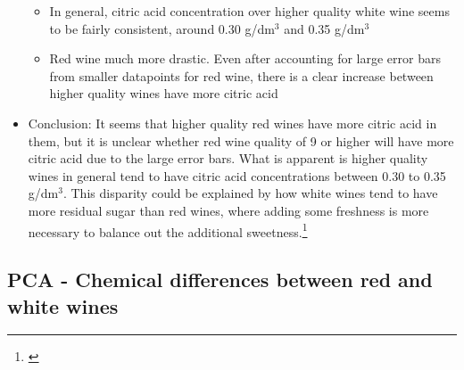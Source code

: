 \documentclass[
]{article}
\providecommand{\tightlist}{%
  \setlength{\itemsep}{0pt}\setlength{\parskip}{0pt}}
\begin{document}
\begin{itemize}
  \begin{itemize}
  \tightlist
  \item
    In general, citric acid concentration over higher quality white wine
    seems to be fairly consistent, around 0.30 g/dm\(^3\) and 0.35
    g/dm\(^3\)
  \item
    Red wine much more drastic. Even after accounting for large error
    bars from smaller datapoints for red wine, there is a clear increase
    between higher quality wines have more citric acid
  \end{itemize}
\item
  Conclusion: It seems that higher quality red wines have more citric
  acid in them, but it is unclear whether red wine quality of 9 or
  higher will have more citric acid due to the large error bars. What is
  apparent is higher quality wines in general tend to have citric acid
  concentrations between 0.30 to 0.35 g/dm\(^3\). This disparity could
  be explained by how white wines tend to have more residual sugar than
  red wines, where adding some freshness is more necessary to balance
  out the additional sweetness.\footnote{\textcite{RN1}}
\end{itemize}

\subsection{PCA - Chemical differences between red and white
wines}\label{pca---chemical-differences-between-red-and-white-wines}
\end{document}
